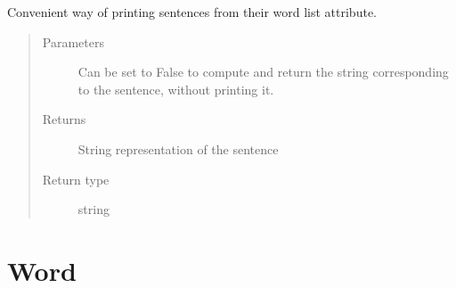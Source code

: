 \documentclass[letterpaper,10pt,english]{sphinxmanual}
\begin{document}
\begin{fulllineitems}
\begin{fulllineitems}
\begin{quote}
\begin{quote}
\begin{description}
\end{description}\end{quote}
\end{quote}

\end{fulllineitems}


\begin{fulllineitems}
\label{\detokenize{index:loacore.classes.classes.Sentence.print_sentence}}
Convenient way of printing sentences from their word list attribute.
\begin{quote}\begin{description}
\item[{Parameters}] \leavevmode
{} \textendash{} Can be set to False to compute and return the string corresponding to the sentence, without
printing it.

\item[{Returns}] \leavevmode
String representation of the sentence

\item[{Return type}] \leavevmode
string

\end{description}\end{quote}

\end{fulllineitems}


\end{fulllineitems}



\section{Word}
\label{\detokenize{index:word}}
\end{document}
